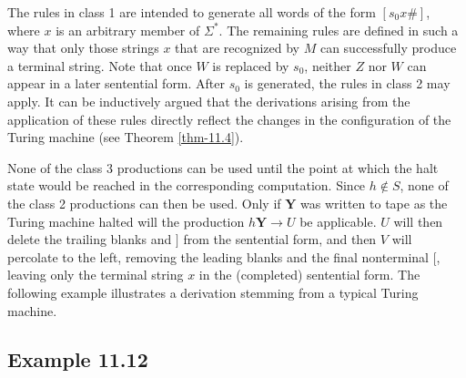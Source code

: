 The rules in class 1 are intended to generate all words of the form $[s_0x
\pmb{\#}]$, where $x$ is an arbitrary member of $\Sigma^*$. The remaining rules
are defined in such a way that only those strings $x$ that are recognized by $M$
can successfully produce a terminal string. Note that once $W$ is replaced by
$s_0$, neither $Z$ nor $W$ can appear in a later sentential form. After $s_0$ is
generated, the rules in class 2 may apply. It can be inductively argued that the
derivations arising from the application of these rules directly reflect the
changes in the configuration of the Turing machine (see Theorem \ref{thm-11.4}).

None of the class 3 productions can be used until the point at which the halt
state would be reached in the corresponding computation. Since $h\not \in S$, none
of the class 2 productions can then be used. Only if $\pmb{Y}$ was written to tape as
the Turing machine halted will the production $h\pmb{Y}\rightarrow U$ be
applicable. $U$ will then delete the trailing blanks and $]$ from the sentential
form, and then $V$ will percolate to the left, removing the leading blanks and
the final nonterminal $[$, leaving only the terminal string $x$ in the
(completed) sentential form. The following example illustrates a derivation
stemming from a typical Turing machine.

\subsection*{Example 11.12}

